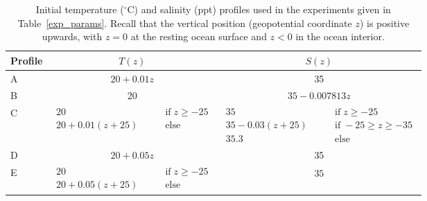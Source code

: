 \documentclass[preprint,12pt,authoryear]{agujournal}
\begin{document}
\begin{table}
	\centering
	\def\arraystretch{1.5}
	\begin{tabular}{ l  c  c  }
		\hline
		Profile & $T(z)$ & $S(z)$ \\
		\hline
		A & $20 + 0.01z$ & 35  \\
		B & 20 & $35 - 0.007813z$  \\
		C & $\begin{array} {lll} 20 \qquad & \mbox{if} \; z \geq -25 \\  20 + 0.01 (z + 25) \qquad & \mbox{else} \end{array}$ & $\begin{array} {lll} 35 \qquad & \mbox{if} \; z \geq -25 \\ 35 - 0.03(z+25) \qquad &\mbox{if} \; -25 \geq z \geq -35 \\ 35.3 \qquad &\mbox{else} \end{array}$  \\
        D & $20 + 0.05z$ & 35  \\
        E & $\begin{array} {lll} 20 \qquad & \mbox{if} \; z \geq -25 \\  20 + 0.05 (z + 25) \qquad & \mbox{else} \end{array}$ & $\begin{array} {lll} 35 \end{array}$  \\
		\hline
	\end{tabular}
	\caption{Initial temperature ($\mbox{}^{\circ}\mbox{C}$) and salinity (ppt) profiles used in the experiments given in Table~\ref{exp_params}.  Recall that the vertical position (geopotential coordinate $z$) is  positive upwards, with $z=0$ at the resting ocean surface and $z<0$ in the ocean interior.} 
	\label{TS_profiles}
\end{table}
\end{document}
